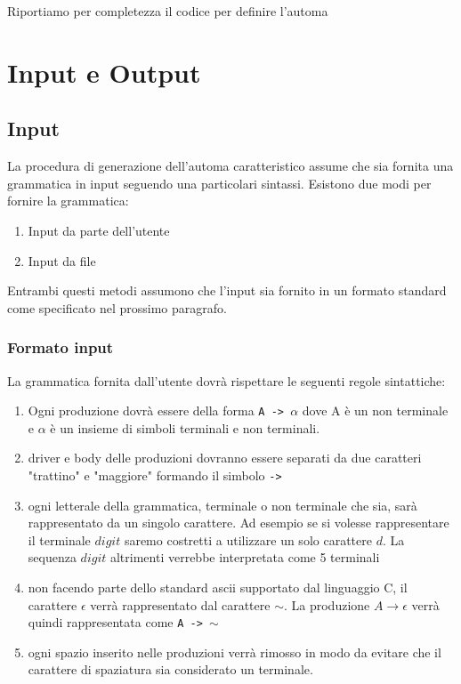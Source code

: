 \documentclass[12pt]{article}
\begin{document}
Riportiamo per completezza il codice per definire l'automa


\section{Input e Output}

\subsection{Input}
La procedura di generazione dell'automa caratteristico assume che sia fornita una grammatica in input seguendo una particolari sintassi. Esistono due modi per fornire la grammatica:
\begin{enumerate}
\item Input da parte dell'utente
\item Input da file
\end{enumerate}

Entrambi questi metodi assumono che l'input sia fornito in un formato standard come specificato nel prossimo paragrafo.

\subsubsection{Formato input}\label{inputformat}
La grammatica fornita dall'utente dovrà rispettare le seguenti regole sintattiche:
\begin{enumerate}
\item Ogni produzione dovrà essere della forma \texttt{A -> $\alpha$} dove A è un non terminale e $\alpha$ è un insieme di simboli terminali e non terminali. 
\item driver e body delle produzioni dovranno essere separati da due caratteri "trattino" e "maggiore" formando il simbolo \texttt{->} 
\item ogni letterale della grammatica, terminale o non terminale che sia, sarà rappresentato da un singolo carattere. Ad esempio se si volesse rappresentare il terminale $digit$ saremo costretti a utilizzare un solo carattere $d$. La sequenza $digit$ altrimenti verrebbe interpretata come 5 terminali
\item non facendo parte dello standard ascii supportato dal linguaggio C, il carattere $\epsilon$ verrà rappresentato dal carattere $\sim$.
La produzione $A \to \epsilon$ verrà quindi rappresentata come \texttt{A -> $\sim$}
\item ogni spazio inserito nelle produzioni verrà rimosso in modo da evitare che il carattere di spaziatura sia considerato un terminale.

\end{enumerate} 
\end{document}
